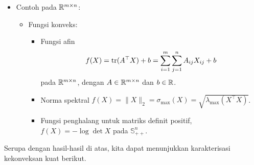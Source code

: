 \begin{example}
\begin{itemize}
\begin{itemize}
\begin{itemize}
\[                        f(x)=\max\{\inner{a_1}{x}+b_1,\ldots,\inner{a_m}{x}+b_m\},
                    \]
                dengan $a_i\in\R^n$ dan $b_i\in\R$.
                \item Perspektif suatu fungsi, $f(x,y)=yg(x/y)$, dengan
                $g:\R^n\rightarrow\R$ fungsi konveks, $x\in\R^n$, dan
                $y\in(0,\infty)$. Jadi domain perspektif ini adalah
                $\R^n\times(0,\infty)$.
            \end{itemize}
            \item Fungsi konkaf:
            \begin{itemize}
                \item Minimum fungsi-fungsi afin:
                    \[
                        f(x)=\min\{\inner{a_1}{x}+b_1,\ldots,\inner{a_m}{x}+b_m\}.
                    \]
            \end{itemize}
        \end{itemize}
        \item Contoh pada $\mathbb{R}^{m\times n}$:
        \begin{itemize}
            \item Fungsi konveks:
            \begin{itemize}
                \item Fungsi afin
                    \[
                        f(X)=\operatorname{\mathrm{tr}}(A^\top X)+b=\sum_{i=1}^m\sum_{j=1}^n A_{ij}X_{ij}+b
                    \]
                    pada $\mathbb{R}^{m\times n}$, dengan $A\in\mathbb{R}^{m\times n}$ dan $b\in\mathbb{R}$.
                \item Norma spektral $f(X)=\|X\|_2=\sigma_{\text{max}}(X)=\sqrt{\lambda_{\text{max}}(X^\top X)}$.
                \item Fungsi penghalang untuk matriks definit positif, $f(X)=-\log\det X$ pada $\mathbb{S}_{++}^n$.
            \end{itemize}
        \end{itemize}
    \end{itemize}
\end{example}

Serupa dengan hasil-hasil di atas, kita dapat menunjukkan karakterisasi kekonveksan kuat berikut.

